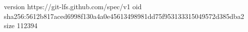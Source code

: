 version https://git-lfs.github.com/spec/v1
oid sha256:5612b817aced6998f130a4a0e45613498981dd75f953133315049572d385dba2
size 112394
